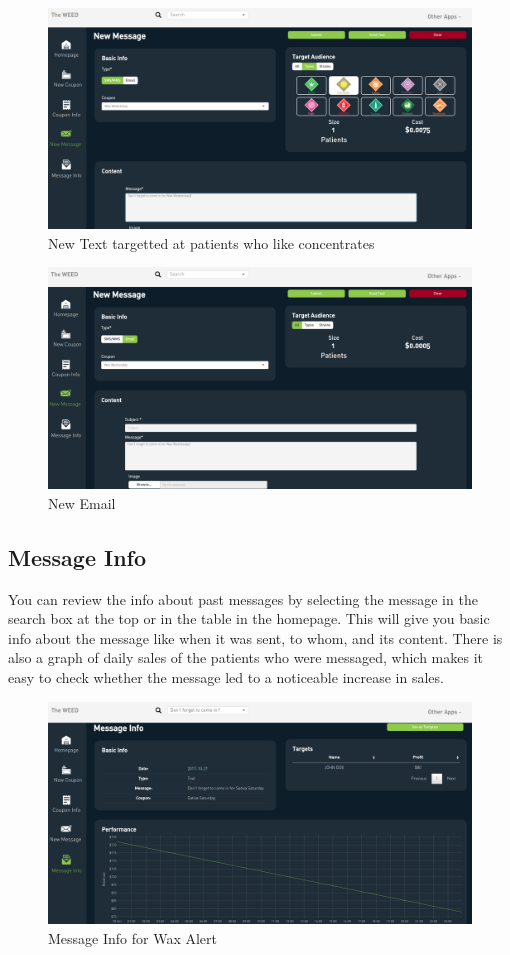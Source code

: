 \documentclass[]{book}
\theoremstyle{definition}
\theoremstyle{definition}
\theoremstyle{definition}
\theoremstyle{remark}
\begin{document}
\begin{figure}
\centering
\includegraphics{images/C7.png}
\caption{New Text targetted at patients who like concentrates}
\end{figure}

\begin{figure}
\centering
\includegraphics{images/C8.png}
\caption{New Email}
\end{figure}

\subsection{Message Info}\label{message-info}

You can review the info about past messages by selecting the message in
the search box at the top or in the table in the homepage. This will
give you basic info about the message like when it was sent, to whom,
and its content. There is also a graph of daily sales of the patients
who were messaged, which makes it easy to check whether the message led
to a noticeable increase in sales.

\begin{figure}
\centering
\includegraphics{images/C10.png}
\caption{Message Info for Wax Alert}
\end{figure}
\end{document}
